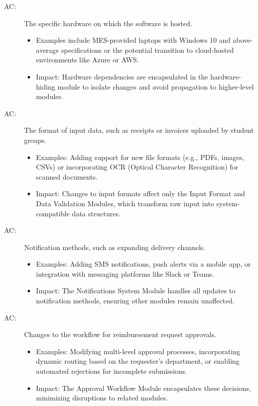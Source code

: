 \documentclass[12pt, titlepage]{article}
\newcounter{acnum}
\newcommand{\actheacnum}{AC\theacnum}
\begin{document}
\begin{description}
\item[ \actheacnum \label{acHardware}:] The specific hardware on which the software is hosted. 
\begin{itemize}
    \item Examples include MES-provided laptops with Windows 10 and above-average specifications or the potential transition to cloud-hosted environments like Azure or AWS. 
    \item Impact: Hardware dependencies are encapsulated in the hardware-hiding module to isolate changes and avoid propagation to higher-level modules.
\end{itemize}

\item[ \actheacnum \label{acInput}:] The format of input data, such as receipts or invoices uploaded by student groups. 
\begin{itemize}
    \item Examples: Adding support for new file formats (e.g., PDFs, images, CSVs) or incorporating OCR (Optical Character Recognition) for scanned documents.
    \item Impact: Changes to input formats affect only the Input Format and Data Validation Modules, which transform raw input into system-compatible data structures.
\end{itemize}

\item[ \actheacnum \label{acNotifications}:] Notification methods, such as expanding delivery channels. 
\begin{itemize}
    \item Examples: Adding SMS notifications, push alerts via a mobile app, or integration with messaging platforms like Slack or Teams.
    \item Impact: The Notifications System Module handles all updates to notification methods, ensuring other modules remain unaffected.
\end{itemize}

\item[ \actheacnum \label{acWorkflow}:] Changes to the workflow for reimbursement request approvals. 
\begin{itemize}
    \item Examples: Modifying multi-level approval processes, incorporating dynamic routing based on the requester’s department, or enabling automated rejections for incomplete submissions.
    \item Impact: The Approval Workflow Module encapsulates these decisions, minimizing disruptions to related modules.
\end{itemize}


\end{description}
\end{document}
